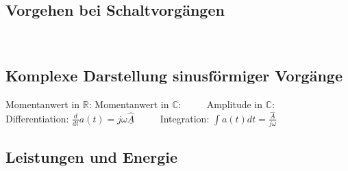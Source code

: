 	\subsection{Vorgehen bei Schaltvorgängen}
	 $\qquad$
	
	\subsection{Komplexe Darstellung sinusförmiger Vorgänge}
	Momentanwert in $\mathbb{R}$:  \qquad
	Momentanwert in $\mathbb{C}$:  $\qquad$ 
	Amplitude in $\mathbb{C}$: \\
	
	Differentiation: $\frac{d}{dt} a(t) = j \omega \underline{\hat{A}}$ $\qquad$ 
	Integration: $\int a(t) dt = \frac{\hat{A}}{j \omega}$
	
	\subsection{Leistungen und Energie}
